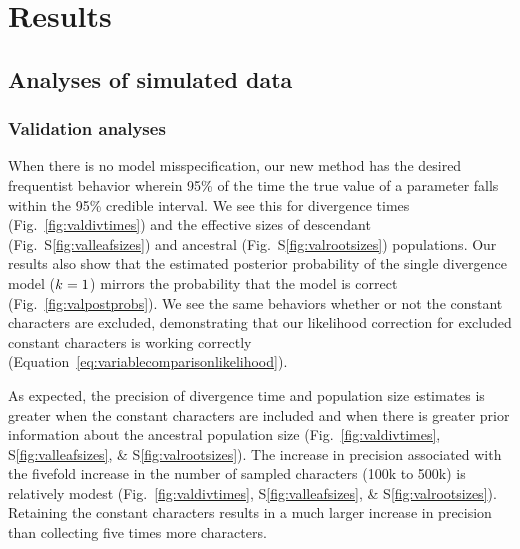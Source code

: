\section{Results}

\subsection{Analyses of simulated data}

\subsubsection{Validation analyses}

When there is no model misspecification, our new method has the desired
frequentist behavior wherein 95\% of the time the true value of a parameter
falls within the 95\% credible interval.
We see this for
divergence times
(Fig.~\ref{fig:valdivtimes})
and the effective sizes of
descendant
(Fig.~S\ref{fig:valleafsizes})
and ancestral
(Fig.~S\ref{fig:valrootsizes})
populations.
Our results also show that the estimated posterior probability of the single
divergence model ($k_{}{} = 1$) mirrors the probability that the model
is correct 
(Fig.~\ref{fig:valpostprobs}).
We see the same behaviors whether or not the constant characters are excluded,
demonstrating that our likelihood correction for excluded constant
characters is working correctly
(Equation~\ref{eq:variablecomparisonlikelihood}).

\ifembed{



}{}

As expected, the precision of divergence time and population size estimates is
greater when the constant characters are included and when there is greater
prior information about the ancestral population size
(Fig.\ \ref{fig:valdivtimes}, S\ref{fig:valleafsizes}, \&
S\ref{fig:valrootsizes}).
The increase in precision associated with the fivefold increase in the number
of sampled characters (100k to 500k) is relatively modest (Fig.\ 
\ref{fig:valdivtimes}, S\ref{fig:valleafsizes}, \& S\ref{fig:valrootsizes}).
Retaining the constant characters results in a much larger increase in
precision than collecting five times more characters.

